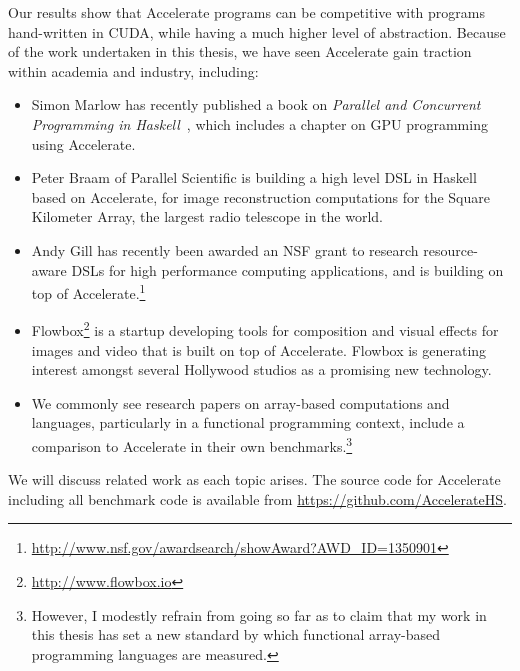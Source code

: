 Our results show that Accelerate programs can be competitive with programs
hand-written in CUDA\cuda{}, while having a much higher level of abstraction.
Because of the work undertaken in this thesis, we have seen Accelerate gain
traction within academia and industry, including:

\begin{itemize}
    \item Simon Marlow has recently published a book on \emph{Parallel and
        Concurrent Programming in Haskell}~\cite{Marlow:2013wn}, which includes
        a chapter on GPU programming using Accelerate.

    \item Peter Braam of Parallel Scientific is building a high level DSL in
        Haskell based on Accelerate, for image reconstruction computations for
        the Square Kilometer Array, the largest radio telescope in the world.

    \item Andy Gill has recently been awarded an NSF grant to research
        resource-aware DSLs for high performance computing applications, and is
        building on top of Accelerate.\footnote{\url{http://www.nsf.gov/awardsearch/showAward?AWD_ID=1350901}}

    \item Flowbox\footnote{\url{http://www.flowbox.io}} is a startup developing
        tools for composition and visual effects for images and video that is
        built on top of Accelerate. Flowbox is generating interest amongst
        several Hollywood studios as a promising new technology.


    \item We commonly see research papers on array-based computations and
        languages, particularly in a functional programming context, include a
        comparison to Accelerate in their own benchmarks.\footnote{However, I
        modestly refrain from going so far as to claim that my work in this
        thesis has set a new standard by which functional array-based
        programming languages are measured.}

\end{itemize}

We will discuss related work as each topic arises. The source code for
Accelerate including all benchmark code is available from
\url{https://github.com/AccelerateHS}.


